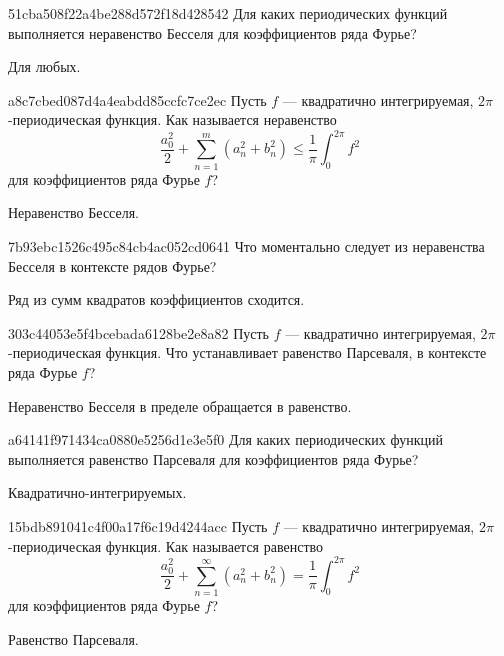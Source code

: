 \begin{note}{51cba508f22a4be288d572f18d428542}
    Для каких периодических функций выполняется неравенство Бесселя для коэффициентов ряда Фурье?

    \begin{cloze}{1}
        Для любых.
    \end{cloze}
\end{note}

\begin{note}{a8c7cbed087d4a4eabdd85ccfc7ce2ec}
    Пусть \({ f }\) --- квадратично интегрируемая, \({ 2\pi }\)-периодическая функция.
    Как называется неравенство
    \[
        \frac{a_0^2}{2} + \sum_{n=1}^{m}  (a_n^2 + b_n^2) \leqslant \frac{1}{\pi} \int_{0}^{2\pi} f^2
    \]
    для коэффициентов ряда Фурье \({ f }\)?

    \begin{cloze}{1}
        Неравенство Бесселя.
    \end{cloze}
\end{note}

\begin{note}{7b93ebc1526c495c84cb4ac052cd0641}
    Что моментально следует из неравенства Бесселя в контексте рядов Фурье?

    \begin{cloze}{1}
        Ряд из сумм квадратов коэффициентов сходится.
    \end{cloze}
\end{note}

\begin{note}{303c44053e5f4bcebada6128be2e8a82}
    Пусть \({ f }\) --- квадратично интегрируемая, \({ 2\pi }\)-периодическая функция.
    Что устанавливает равенство Парсеваля, в контексте ряда Фурье \({ f }\)?

    \begin{cloze}{1}
        Неравенство Бесселя в пределе обращается в равенство.
    \end{cloze}
\end{note}

\begin{note}{a64141f971434ca0880e5256d1e3e5f0}
    Для каких периодических функций выполняется равенство Парсеваля для коэффициентов ряда Фурье?

    \begin{cloze}{1}
        Квадратично-интегрируемых.
    \end{cloze}
\end{note}

\begin{note}{15bdb891041c4f00a17f6c19d4244acc}
    Пусть \({ f }\) --- квадратично интегрируемая, \({ 2\pi }\)-периодическая функция.
    Как называется равенство
    \[
        \frac{a_0^2}{2} + \sum_{n=1}^{\infty} (a_n^2 + b_n^2) = \frac{1}{\pi} \int_{0}^{2\pi} f^2
    \]
    для коэффициентов ряда Фурье \({ f }\)?

    \begin{cloze}{1}
        Равенство Парсеваля.
    \end{cloze}
\end{note}

